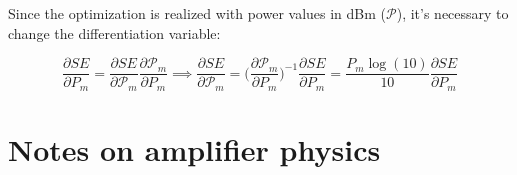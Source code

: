 \documentclass[a4paper]{article}
\begin{document}
Since the optimization is realized with power values in dBm ($\mathcal{P}$), it's necessary to change the differentiation variable:

\begin{equation}
\frac{\partial SE}{\partial P_m} = \frac{\partial SE}{\partial \mathcal{P}_m}\frac{\partial\mathcal{P}_m}{\partial P_m} \implies \frac{\partial SE}{\partial \mathcal{P}_m} =  \bigg(\frac{\partial\mathcal{P}_m}{\partial P_m}\bigg)^{-1}\frac{\partial SE}{\partial P_m} = \frac{P_m\log(10)}{10}\frac{\partial SE}{\partial P_m}
\end{equation}

%

\newpage
\section{Notes on amplifier physics}
\end{document}
